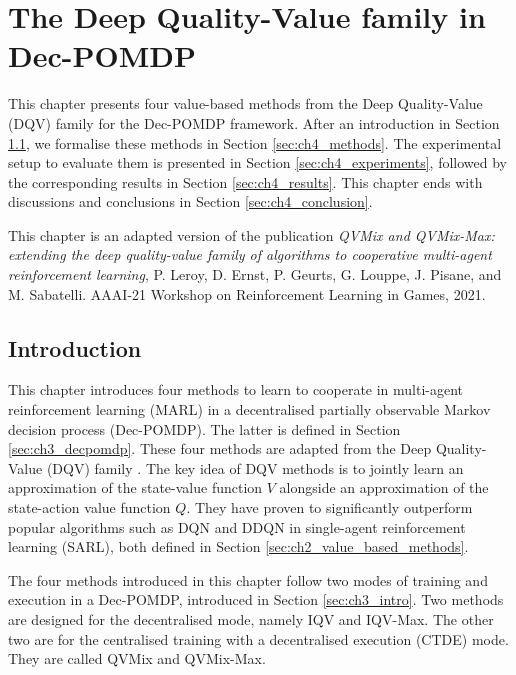 \chapter{The Deep Quality-Value family in Dec-POMDP}\label{ch:qvmix}
\begin{chapter_outline}

This chapter presents four value-based methods from the Deep Quality-Value (DQV) family for the Dec-POMDP framework.
After an introduction in Section \ref{sec:ch4_intro}, we formalise these methods in Section \ref{sec:ch4_methods}.
The experimental setup to evaluate them is presented in Section \ref{sec:ch4_experiments}, followed by the corresponding results in Section \ref{sec:ch4_results}.
This chapter ends with discussions and conclusions in Section \ref{sec:ch4_conclusion}.

This chapter is an adapted version of the publication \citep{leroy2020qvmix} \textit{QVMix and QVMix-Max: extending the deep quality-value family of algorithms to cooperative multi-agent reinforcement learning}, P. Leroy, D. Ernst, P. Geurts, G. Louppe, J. Pisane, and M. Sabatelli. AAAI-21 Workshop on Reinforcement Learning in Games, 2021.

\end{chapter_outline}


\section{Introduction} \label{sec:ch4_intro}

This chapter introduces four methods to learn to cooperate in multi-agent reinforcement learning (MARL) in a decentralised partially observable Markov decision process (Dec-POMDP).
The latter is defined in Section \ref{sec:ch3_decpomdp}.
These four methods are adapted from the Deep Quality-Value (DQV) family \citep{sabatelli2020deep}.
The key idea of DQV methods is to jointly learn an approximation of the state-value function $V$ alongside an approximation of the state-action value function $Q$.
They have proven to significantly outperform popular algorithms such as DQN \cite{Mnih2015} and DDQN \cite{van2016deep} in single-agent reinforcement learning (SARL), both defined in Section \ref{sec:ch2_value_based_methods}.

The four methods introduced in this chapter follow two modes of training and execution in a Dec-POMDP, introduced in Section \ref{sec:ch3_intro}.
Two methods are designed for the decentralised mode, namely IQV and IQV-Max.
The other two are for the centralised training with a decentralised execution (CTDE) mode. 
They are called QVMix and QVMix-Max.

